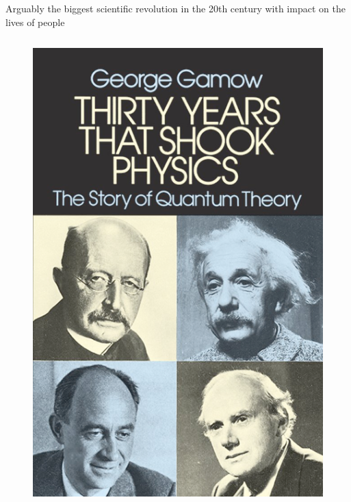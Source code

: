 \documentclass[aspectratio=169]{beamer}
\begin{document}
\begin{frame}{Arguably the biggest scientific revolution in the 20th century with impact on the lives of people}
\begin{columns}
\begin{figure}
    \includegraphics[width=\linewidth]{lectures/figures/30yearsthatshookphysics.png}
\end{figure}
\end{columns}
\end{frame}
\end{document}
